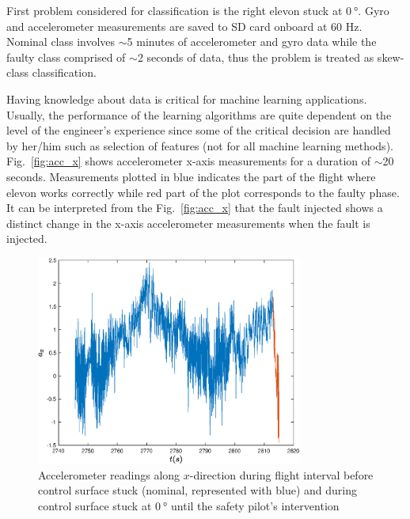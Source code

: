 First problem considered for classification is the right elevon stuck at $\SI{0}{\degree}$.
Gyro and accelerometer measurements are saved to SD card onboard at 60 Hz. 
Nominal class involves $\sim$5 minutes of accelerometer and gyro data while the faulty class comprised of $\sim$2 seconds of data, thus the problem is treated as skew-class classification. 

Having knowledge about data is critical for machine learning applications. 
Usually, the performance of the learning algorithms are quite dependent on the level of the engineer's experience since some of the critical decision are handled by her/him such as selection of features (not for all machine learning methods).
Fig.~\ref{fig:acc_x} shows accelerometer x-axis measurements for a duration of $\sim$20 seconds. 
Measurements plotted in blue indicates the part of the flight where elevon works correctly while red part of the plot corresponds to the faulty phase. 
It can be interpreted from the Fig.~\ref{fig:acc_x} that the fault injected shows a distinct change in the x-axis accelerometer measurements when the fault is injected. 

\begin{figure}[H]
\begin{center}
\includegraphics[width=0.78\textwidth]{figures/acc_x_evenLongerNominal}    %
\caption{Accelerometer readings along $x$-direction during flight interval before control surface stuck (nominal, represented with blue) and during control surface stuck at  $\SI{0}{\degree}$ until the safety pilot's intervention} 
\label{fig:acc_x_evenLongerNominal}
\end{center}
\end{figure}



